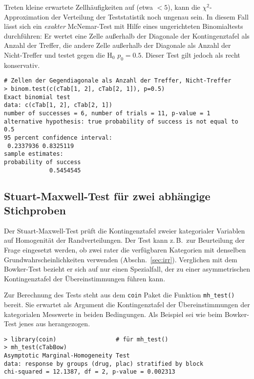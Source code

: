 Treten kleine erwartete Zellhäufigkeiten auf (etwa $< 5$), kann die $\chi^{2}$-Approximation der Verteilung der Teststatistik noch ungenau sein. In diesem Fall lässt sich ein \emph{exakter} McNemar-Test mit Hilfe eines ungerichteten Binomialtests durchführen: Er wertet eine Zelle außerhalb der Diagonale der Kontingenztafel als Anzahl der Treffer, die andere Zelle außerhalb der Diagonale als Anzahl der Nicht-Treffer und testet gegen die $\text{H}_{0}$  $p_{0} = 0.5$. Dieser Test gilt jedoch als recht konservativ.
\begin{lstlisting}
# Zellen der Gegendiagonale als Anzahl der Treffer, Nicht-Treffer
> binom.test(c(cTab[1, 2], cTab[2, 1]), p=0.5)
Exact binomial test
data: c(cTab[1, 2], cTab[2, 1])
number of successes = 6, number of trials = 11, p-value = 1
alternative hypothesis: true probability of success is not equal to 0.5
95 percent confidence interval:
 0.2337936 0.8325119
sample estimates:
probability of success
             0.5454545
\end{lstlisting}

\subsection{Stuart-Maxwell-Test für zwei abhängige Stichproben}
\label{sec:stuartMaxwell}

Der Stuart-Maxwell-Test prüft die Kontingenztafel zweier kategorialer Variablen auf Homogenität der Randverteilungen. Der Test kann z.\,B.\ zur Beurteilung der Frage eingesetzt werden, ob zwei rater die verfügbaren Kategorien mit denselben Grundwahrscheinlichkeiten verwenden (Abschn.\ \ref{sec:irr}). Verglichen mit dem Bowker-Test bezieht er sich auf nur einen Spezialfall, der zu einer asymmetrischen Kontingenztafel der Übereinstimmungen führen kann.

Zur Berechnung des Tests steht aus dem \lstinline!coin! Paket die Funktion \lstinline!mh_test()! bereit. Sie erwartet als Argument die Kontingenztafel der Übereinstimmungen der kategorialen Messwerte in beiden Bedingungen. Als Beispiel sei wie beim Bowker-Test jenes aus  herangezogen.
\begin{lstlisting}
> library(coin)                 # für mh_test()
> mh_test(cTabBow)
Asymptotic Marginal-Homogeneity Test
data: response by groups (drug, plac) stratified by block
chi-squared = 12.1387, df = 2, p-value = 0.002313
\end{lstlisting}

